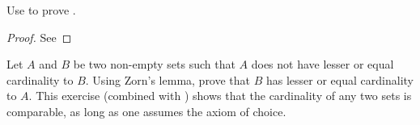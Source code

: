 \begin{ex}\label{i:ex:8.5.14}
  Use  to prove .
\end{ex}

\begin{proof}
  See 
\end{proof}

\begin{ex}\label{i:ex:8.5.15}
  Let \(A\) and \(B\) be two non-empty sets such that \(A\) does not have lesser or equal cardinality to \(B\).
  Using Zorn's lemma, prove that \(B\) has lesser or equal cardinality to \(A\).
  This exercise (combined with ) shows that the cardinality of any two sets is comparable, as long as one assumes the axiom of choice.
\end{ex}

